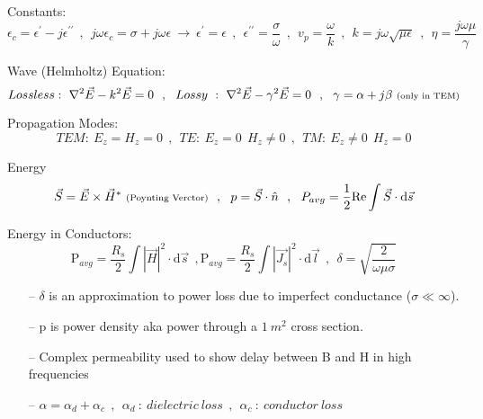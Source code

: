 Constants:
$$ {\epsilon}_c = {\epsilon}^{\prime} - j {\epsilon}^{\prime\prime}  ~~ , ~~ j \omega {\epsilon}_c = \sigma + j \omega \epsilon ~ \rightarrow ~  {\epsilon}^\prime = {\epsilon} ~~ , ~~ {\epsilon}^{\prime\prime} = \frac{\sigma}{\omega}  ~~ , ~~ v_p = \frac{\omega}{k} ~~ , ~~ k = j \omega \sqrt{\mu \epsilon} ~~ , ~~  \eta = \frac{j \omega \mu}{\gamma} $$
\par
Wave (Helmholtz) Equation:
$$Lossless:~ \nabla^2 \vec{E} - k^2 \vec{E} = 0 ~~ , ~~ Lossy ~ : ~ \nabla^2 \vec{E} - {\gamma}^2 \vec{E} = 0 ~~ , ~~ \gamma = \alpha + j\beta~ \text{\scriptsize(only~in~TEM)}  $$
\par
Propagation Modes: 
$$TEM:~ E_z = H_z = 0 ~~ , ~~ TE:~ E_z = 0 ~~ H_z \neq 0 ~~ , ~~ TM:~ E_z \neq 0 ~~ H_z = 0 $$
\par
Energy
$$ \vec{S} = \vec{E} \times  \vec{H}^*~\text{\scriptsize(Poynting~Verctor)} ~~ , ~~ p = \vec{S} \cdot \hat{n} ~~ , ~~ P_{avg} = \frac{1}{2} \text{Re} \int{ \vec{S} \cdot \mathrm{d}\vec{s}}$$
\par
Energy in Conductors: 
$$  \text{P}_{avg} =  \frac{R_s}{2} \int{ | \vec{H} | ^ 2 \cdot \mathrm{d}\vec{s}} ~~ , \text{P}_{avg} =  \frac{R_s}{2} \int{ | \vec{J_s} | ^ 2 \cdot \mathrm{d}\vec{l}} ~~ , ~~ \delta = \sqrt{\frac{2}{\omega \mu \sigma}} $$
\setlength{\parindent}{0.5cm} %
\vspace{-10pt}\par
\setlength{\parindent}{0.0cm}
\par\noindent
\begin{itemize}
\item[--] $\delta$ is an approximation to power loss due to imperfect conductance ($\sigma\ll\infty$).
\item[--] p is power density aka power through a $1~m^2$ cross section.
\item[--] Complex permeability used to show delay between B and H in high frequencies
\item[--] $\alpha = {\alpha}_d + {\alpha}_c ~~ , ~~ {\alpha}_d ~: ~ dielectric~loss ~~ , ~~ {\alpha}_c ~ : ~ conductor~loss$
\end{itemize}
\par
\setlength{\parindent}{0.0cm} %
